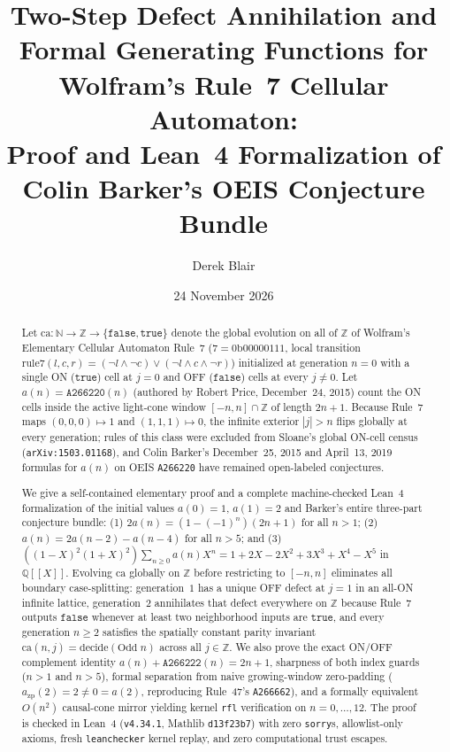 \documentclass[11pt]{article}
\title{Two-Step Defect Annihilation and Formal Generating Functions for Wolfram's Rule~7 Cellular Automaton:\\[2pt]
\large Proof and Lean~4 Formalization of Colin Barker's OEIS \seq{A266220} Conjecture Bundle}
\author{Derek Blair}
\date{24 November 2026}
\newcommand{\llbracket}{[\![}
\newcommand{\rrbracket}{]\!]}
\theoremstyle{definition}
\newcommand{\N}{\mathbb{N}}
\newcommand{\Z}{\mathbb{Z}}
\newcommand{\Q}{\mathbb{Q}}
\newcommand{\seq}[1]{\texttt{#1}}
\newcommand{\ca}{\mathrm{ca}}
\newcommand{\ruleSeven}{\mathrm{rule7}}
\newcommand{\btrue}{\mathtt{true}}
\newcommand{\bfalse}{\mathtt{false}}
\begin{document}
\maketitle

\begin{abstract}
Let $\ca : \N \to \Z \to \{\bfalse, \btrue\}$ denote the global evolution on all of $\Z$ of Wolfram's Elementary Cellular Automaton Rule~7 ($7 = 0\mathrm{b}00000111$, local transition $\ruleSeven(l, c, r) = (\neg l \land \neg c) \lor (\neg l \land c \land \neg r)$) initialized at generation $n = 0$ with a single ON ($\btrue$) cell at $j = 0$ and OFF ($\bfalse$) cells at every $j \ne 0$. Let $a(n) = \seq{A266220}(n)$ (authored by Robert Price, December~24, 2015) count the ON cells inside the active light-cone window $[-n, n] \cap \Z$ of length $2n + 1$. Because Rule~7 maps $(0, 0, 0) \mapsto 1$ and $(1, 1, 1) \mapsto 0$, the infinite exterior $|j| > n$ flips globally at every generation; rules of this class were excluded from Sloane's global ON-cell census (\texttt{arXiv:1503.01168}), and Colin Barker's December~25, 2015 and April~13, 2019 formulas for $a(n)$ on OEIS \seq{A266220} have remained open-labeled conjectures.

We give a self-contained elementary proof and a complete machine-checked Lean~4 formalization of the initial values $a(0) = 1$, $a(1) = 2$ and Barker's entire three-part conjecture bundle: (1) $2a(n) = (1 - (-1)^n)(2n + 1)$ for all $n > 1$; (2) $a(n) = 2a(n - 2) - a(n - 4)$ for all $n > 5$; and (3) $((1 - X)^2(1 + X)^2)\sum_{n \ge 0} a(n) X^n = 1 + 2X - 2X^2 + 3X^3 + X^4 - X^5$ in $\Q\llbracket X \rrbracket$. Evolving $\ca$ globally on $\Z$ before restricting to $[-n, n]$ eliminates all boundary case-splitting: generation~$1$ has a unique OFF defect at $j = 1$ in an all-ON infinite lattice, generation~$2$ annihilates that defect everywhere on $\Z$ because Rule~7 outputs $\bfalse$ whenever at least two neighborhood inputs are $\btrue$, and every generation $n \ge 2$ satisfies the spatially constant parity invariant $\ca(n, j) = \mathrm{decide}(\mathrm{Odd}\; n)$ across all $j \in \Z$. We also prove the exact ON/OFF complement identity $a(n) + \seq{A266222}(n) = 2n + 1$, sharpness of both index guards ($n > 1$ and $n > 5$), formal separation from naive growing-window zero-padding ($a_{\mathrm{zp}}(2) = 2 \ne 0 = a(2)$, reproducing Rule~47's \seq{A266662}), and a formally equivalent $O(n^2)$ causal-cone mirror yielding kernel \texttt{rfl} verification on $n = 0, \dots, 12$. The proof is checked in Lean~4 (\texttt{v4.34.1}, Mathlib \texttt{d13f23b7}) with zero \texttt{sorry}s, allowlist-only axioms, fresh \texttt{leanchecker} kernel replay, and zero computational trust escapes.
\end{abstract}
\end{document}
